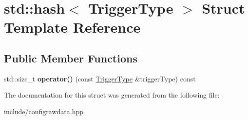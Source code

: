 \hypertarget{structstd_1_1hash_3_01TriggerType_01_4}{}\section{std\+:\+:hash$<$ Trigger\+Type $>$ Struct Template Reference}
\label{structstd_1_1hash_3_01TriggerType_01_4}
\subsection*{Public Member Functions}
\begin{DoxyCompactItemize}
\item 
std\+::size\+\_\+t {\bfseries operator()} (const \hyperlink{structTriggerType}{Trigger\+Type} \&trigger\+Type) const \hypertarget{structstd_1_1hash_3_01TriggerType_01_4_af3f4e82451ec9a7612fc77ff5cc7135b}{}\label{structstd_1_1hash_3_01TriggerType_01_4_af3f4e82451ec9a7612fc77ff5cc7135b}

\end{DoxyCompactItemize}


The documentation for this struct was generated from the following file\+:\begin{DoxyCompactItemize}
\item 
include/configrawdata.\+hpp\end{DoxyCompactItemize}
